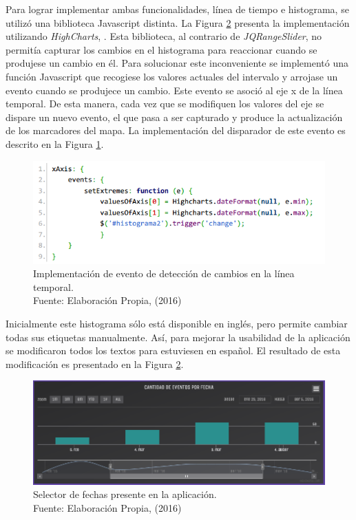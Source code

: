Para lograr implementar ambas funcionalidades, línea de tiempo e histograma, se utilizó una biblioteca Javascript distinta. La Figura \ref{fig:HistogramaFinal} presenta la implementación utilizando \textit{HighCharts}, \cite{Highcharts}. Esta biblioteca, al contrario de \textit{JQRangeSlider}, no permitía capturar los cambios en el histograma para reaccionar cuando se produjese un cambio en él. Para solucionar este inconveniente se implementó una función Javascript que recogiese los valores actuales del intervalo y arrojase un evento cuando se produjece un cambio. Este evento se asoció al eje x de la línea temporal. De esta manera, cada vez que se modifiquen los valores del eje se dispare un nuevo evento, el que pasa a ser capturado y produce la actualización de los marcadores del mapa. La implementación del disparador de este evento es descrito en la Figura \ref{fig:implementacionCambiosEnEje}.

\begin{figure}[H]
	\centering
	\captionsetup{justification=centering}
	\includegraphics[scale=0.8]{images/onChangeEventTimeline.png}
	\caption[Implementación de evento de detección de cambios en la línea temporal.]{Implementación de evento de detección de cambios en la línea temporal.\\Fuente: Elaboración Propia, (2016)}
	\label{fig:implementacionCambiosEnEje}
\end{figure}

Inicialmente este histograma sólo está disponible en inglés, pero permite cambiar todas sus etiquetas manualmente. Así, para mejorar la usabilidad de la aplicación se modificaron todos los textos para estuviesen en español. El resultado de esta modificación es presentado en la Figura \ref{fig:HistogramaFinal}.

\begin{figure}[H]
	\centering
	\captionsetup{justification=centering}
	\includegraphics[scale=0.6]{images/Histograma.png}
	\caption[Selector de fechas presente en la aplicación.]{Selector de fechas presente en la aplicación.\\Fuente: Elaboración Propia, (2016)}
	\label{fig:HistogramaFinal}
\end{figure}

